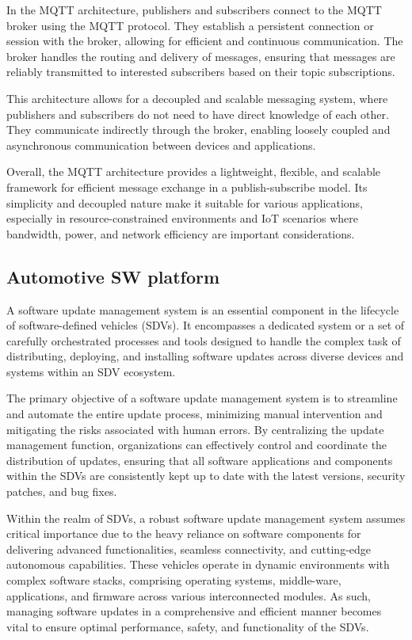 \documentclass[
12pt,
oneside, 
onehalfspacing, 
nolistspacing, 
parskip, 
chapterinoneline, 
]{AASTCOMPUTER}
\begin{document}
In the MQTT architecture, publishers and subscribers connect to the MQTT broker using the MQTT protocol. They establish a persistent connection or session with the broker, allowing for efficient and continuous communication. The broker handles the routing and delivery of messages, ensuring that messages are reliably transmitted to interested subscribers based on their topic subscriptions.

This architecture allows for a decoupled and scalable messaging system, where publishers and subscribers do not need to have direct knowledge of each other. They communicate indirectly through the broker, enabling loosely coupled and asynchronous communication between devices and applications.

Overall, the MQTT architecture provides a lightweight, flexible, and scalable framework for efficient message exchange in a publish-subscribe model. Its simplicity and decoupled nature make it suitable for various applications, especially in resource-constrained environments and IoT scenarios where bandwidth, power, and network efficiency are important considerations.

\subsection{Automotive SW platform}
A software update management system is an essential component in the lifecycle of software-defined vehicles (SDVs). It encompasses a dedicated system or a set of carefully orchestrated processes and tools designed to handle the complex task of distributing, deploying, and installing software updates across diverse devices and systems within an SDV ecosystem.

The primary objective of a software update management system is to streamline and automate the entire update process, minimizing manual intervention and mitigating the risks associated with human errors. By centralizing the update management function, organizations can effectively control and coordinate the distribution of updates, ensuring that all software applications and components within the SDVs are consistently kept up to date with the latest versions, security patches, and bug fixes.

Within the realm of SDVs, a robust software update management system assumes critical importance due to the heavy reliance on software components for delivering advanced functionalities, seamless connectivity, and cutting-edge autonomous capabilities. These vehicles operate in dynamic environments with complex software stacks, comprising operating systems, middle-ware, applications, and firmware across various interconnected modules. As such, managing software updates in a comprehensive and efficient manner becomes vital to ensure optimal performance, safety, and functionality of the SDVs.
\end{document}
